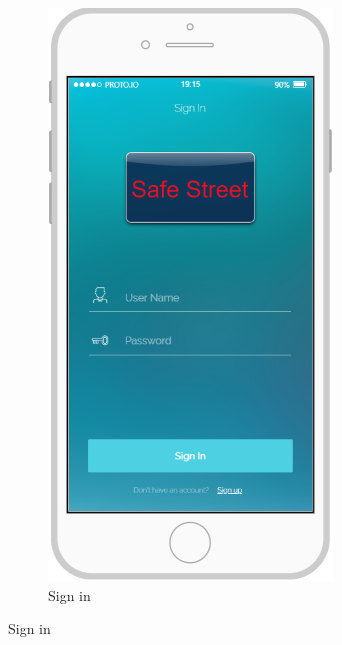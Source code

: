 \documentclass{article}
\begin{document}
			\begin{figure}[H]
				\centering
				\begin{subfigure}[H]{0.25\linewidth}
					\includegraphics[width=\linewidth]{Images/Sign_In.png}
					\caption{Sign in}
				\end{subfigure}	

\end{figure}
\end{document}
